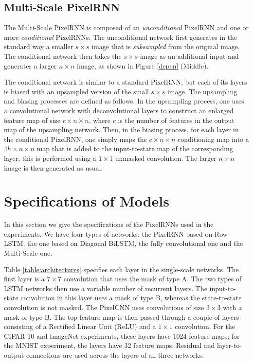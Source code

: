 \documentclass{article}
\begin{document}
\subsection{Multi-Scale PixelRNN}
\label{sect:multiscale}

The Multi-Scale PixelRNN is composed of an \emph{unconditional} PixelRNN and one or more \emph{conditional} PixelRNNs. The unconditional network first generates in the standard way a smaller $s \times s$ image that is \emph{subsampled} from the original image. The conditional network then takes the $s \times s$ image as an additional input and generates a larger $n\times n$ image, as shown in Figure \ref{depen} (Middle).

The conditional network is similar to a standard PixelRNN, but each of its layers is biased with an upsampled version of the small $s \times s$ image. The upsampling and biasing processes are defined as follows. In the upsampling process, one uses a convolutional network with deconvolutional layers to construct an enlarged feature map of size $c \times n \times n$, where $c$ is the number of features in the output map of the upsampling network. Then, in the biasing process, for each layer in the conditional PixelRNN, one simply maps the $c \times n \times n$ conditioning map into a $4h \times n \times n$ map that is added to the input-to-state map of the corresponding layer; this is performed using a $1 \times 1$ unmasked convolution. The larger $n \times n$ image is then generated as usual.


\section{Specifications of Models}

In this section we give the specifications of the PixelRNNs used in the experiments. We have four types of networks: the PixelRNN based on Row LSTM, the one based on Diagonal BiLSTM, the fully convolutional one and the Multi-Scale one. 

Table \ref{table:architectures} specifies each layer in the single-scale networks. The first layer is a $7\times7$ convolution that uses the mask of type A. The two types of LSTM networks then use a variable number of recurrent layers. The input-to-state convolution in this layer uses a mask of type B, whereas the state-to-state convolution is not masked. The PixelCNN uses convolutions of size $3\times3$ with a mask of type B. The top feature map is then passed through a couple of layers consisting of a Rectified Linear Unit (ReLU) and a $1\times1$ convolution. For the CIFAR-10 and ImageNet experiments, these layers have 1024 feature maps; for the MNIST experiment, the layers have 32 feature maps. Residual and layer-to-output connections are used across the layers of all three networks.
\end{document}
